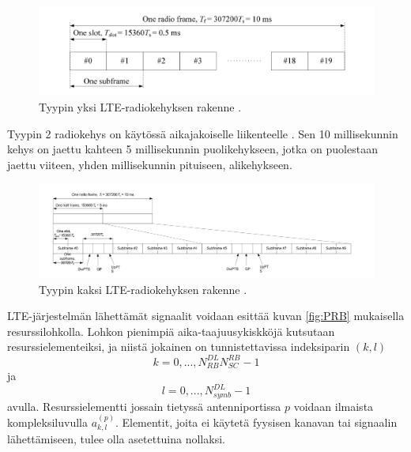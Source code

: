 \documentclass[finnish, 12pt, a4paper, elec, latin1, utf8, online]{aaltothesis}
\begin{document}
\begin{figure}[h!]
    \centering
    \includegraphics[width=\linewidth]{Images/radioframe1.png}
    \caption{Tyypin yksi LTE-radiokehyksen rakenne \cite{ETSIts36211}.}
    \label{fig:type1}
\end{figure}

Tyypin 2 radiokehys on käytössä aikajakoiselle liikenteelle \cite{ETSIts36211}. Sen 10 millisekunnin kehys on jaettu kahteen 5 millisekunnin puolikehykseen, jotka on puolestaan jaettu viiteen, yhden millisekunnin pituiseen, alikehykseen.

\begin{figure}[h!]
    \centering
    \includegraphics[width=\linewidth]{Images/radioframe2.png}
    \caption{Tyypin kaksi LTE-radiokehyksen rakenne \cite{ETSIts36211}.}
    \label{fig:type2}
\end{figure}

LTE-järjestelmän lähettämät signaalit voidaan esittää kuvan \ref{fig:PRB} mukaisella resurssilohkolla. Lohkon pienimpiä aika-taajuusykiskköjä kutsutaan resurssielementeiksi, ja niistä jokainen on tunnistettavissa indeksiparin $(k,l)$
\begin{equation}
    k = 0, ..., N^{DL}_{RB}N^{RB}_{SC} -1
\end{equation} 
ja
\begin{equation}
    l = 0, ..., N^{DL}_{symb} -1
\end{equation}
avulla. Resurssielementti jossain tietyssä antenniportissa $p$ voidaan ilmaista kompleksiluvulla $a_{k,l}^{(p)}$. Elementit, joita ei käytetä fyysisen kanavan tai signaalin lähettämiseen, tulee olla asetettuina nollaksi. \cite{ETSIts36211}
\end{document}
